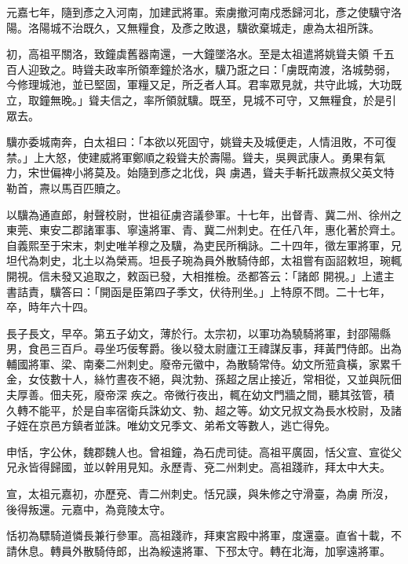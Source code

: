 \begin{pinyinscope}
 元嘉七年，隨到彥之入河南，加建武將軍。索虜撤河南戍悉歸河北，彥之使驥守洛陽。洛陽城不治既久，又無糧食，及彥之敗退，驥欲棄城走，慮為太祖所誅。



 初，高祖平關洛，致鐘虡舊器南還，一大鐘墜洛水。至是太祖遣將姚聳夫領
 千五百人迎致之。時聳夫政率所領牽鐘於洛水，驥乃誑之曰：「虜既南渡，洛城勢弱，今修理城池，並已堅固，軍糧又足，所乏者人耳。君率眾見就，共守此城，大功既立，取鐘無晚。」聳夫信之，率所領就驥。既至，見城不可守，又無糧食，於是引眾去。



 驥亦委城南奔，白太祖曰：「本欲以死固守，姚聳夫及城便走，人情沮敗，不可復禁。」上大怒，使建威將軍鄭順之殺聳夫於壽陽。聳夫，吳興武康人。勇果有氣力，宋世偏裨小將莫及。始隨到彥之北伐，與
 虜遇，聳夫手斬托跋燾叔父英文特勒首，燾以馬百匹贖之。



 以驥為通直郎，射聲校尉，世祖征虜咨議參軍。十七年，出督青、冀二州、徐州之東莞、東安二郡諸軍事、寧遠將軍、青、冀二州刺史。在任八年，惠化著於齊土。自義熙至于宋末，刺史唯羊穆之及驥，為吏民所稱詠。二十四年，徵左軍將軍，兄坦代為刺史，北土以為榮焉。坦長子琬為員外散騎侍郎，太祖嘗有函詔敕坦，琬輒開視。信未發又追取之，敕函已發，大相推檢。丞都答云：「諸郎
 開視。」上遣主書詰責，驥答曰：「開函是臣第四子季文，伏待刑坐。」上特原不問。二十七年，卒，時年六十四。



 長子長文，早卒。第五子幼文，薄於行。太宗初，以軍功為驍騎將軍，封邵陽縣男，食邑三百戶。尋坐巧佞奪爵。後以發太尉廬江王禕謀反事，拜黃門侍郎。出為輔國將軍、梁、南秦二州刺史。廢帝元徽中，為散騎常侍。幼文所蒞貪橫，家累千金，女伎數十人，絲竹晝夜不絕，與沈勃、孫超之居止接近，常相從，又並與阮佃夫厚善。佃夫死，廢帝深
 疾之。帝微行夜出，輒在幼文門牆之間，聽其弦管，積久轉不能平，於是自率宿衛兵誅幼文、勃、超之等。幼文兄叔文為長水校尉，及諸子姪在京邑方鎮者並誅。唯幼文兄季文、弟希文等數人，逃亡得免。



 申恬，字公休，魏郡魏人也。曾祖鐘，為石虎司徒。高祖平廣固，恬父宣、宣從父兄永皆得歸國，並以幹用見知。永歷青、兗二州刺史。高祖踐祚，拜太中大夫。



 宣，太祖元嘉初，亦歷兗、青二州刺史。恬兄謨，與朱修之守滑臺，為虜
 所沒，後得叛還。元嘉中，為竟陵太守。



 恬初為驃騎道憐長兼行參軍。高祖踐祚，拜東宮殿中將軍，度還臺。直省十載，不請休息。轉員外散騎侍郎，出為綏遠將軍、下邳太守。轉在北海，加寧遠將軍。




\end{pinyinscope}
